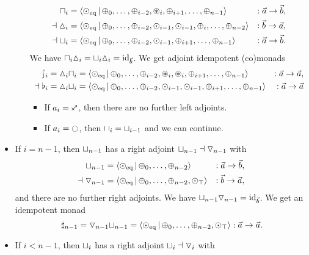 \documentclass[a4paper]{memoir}
\begin{document}
\begin{example}
\begin{itemize}
\begin{itemize}
			\begin{align*}
				{\sqcap}_i &= \mathopen{}\left\langle {\odot}_{\mathrm{eq}} \,\middle|\, {\oplus}_0, \ldots, {\oplus}_{i-2}, {\oast}_i, {\oplus}_{i+1}, \ldots, {\oplus}_{n-1} \right\rangle\mathclose{}
				&: \vec a \to \vec b, \\
				\dashv
				{\vartriangle}_i &= \mathopen{}\left\langle {\odot}_{\mathrm{eq}} \,\middle|\, {\oplus}_0, \ldots, {\oplus}_{i-2}, {\odot}_{i-1}, {\odot}_{i-1}, {\oplus}_i, \ldots, {\oplus}_{n-2} \right\rangle\mathclose{}
				&: \vec b \to \vec a, \\
				\dashv
				{\sqcup}_i &= \mathopen{}\left\langle {\odot}_{\mathrm{eq}} \,\middle|\, {\oplus}_0, \ldots, {\oplus}_{i-2}, {\odot}_{i-1}, {\oplus}_{i+1}, \ldots, {\oplus}_{n-1} \right\rangle\mathclose{}
				&: \vec a \to \vec b.
			\end{align*}
			We have ${\sqcap}_i {\vartriangle}_i = {\sqcup}_i {\vartriangle}_i = \mathrm{id}_{\vec b}$. We get adjoint idempotent (co)monads
			\begin{align*}
				\rbag_i = {\vartriangle}_i {\sqcap}_i &= \mathopen{}\left\langle {\odot}_{\mathrm{eq}} \,\middle|\, {\oplus}_0, \ldots, {\oplus}_{i-2}, {\oast}_i, {\oast}_i, {\oplus}_{i+1}, \ldots, {\oplus}_{n-1} \right\rangle\mathclose{} &: \vec a \to \vec a, \\
				\dashv
				\flat_i = {\vartriangle}_i {\sqcup}_i &= \mathopen{}\left\langle {\odot}_{\mathrm{eq}} \,\middle|\, {\oplus}_0, \ldots, {\oplus}_{i-2}, {\odot}_{i-1}, {\odot}_{i-1}, {\oplus}_{i+1}, \ldots, {\oplus}_{n-1} \right\rangle\mathclose{} &: \vec a \to \vec a
			\end{align*}
			\begin{itemize}
				\item If $a_i = \ypolar$, then there are no further left adjoints.
				\item If $a_i = \npolar$, then ${\sqcap}_i = {\sqcup}_{i-1}$ and we can continue.
			\end{itemize}
		\end{itemize}
		\item If $i = n-1$, then ${\sqcup}_{n-1}$ has a right adjoint ${\sqcup}_{n-1} \dashv {\triangledown}_{n-1}$ with
		\begin{align*}
			{\sqcup}_{n-1} &= \mathopen{}\left\langle {\odot}_{\mathrm{eq}} \,\middle|\, {\oplus}_0, \ldots, {\oplus}_{n-2} \right\rangle\mathclose{} &: \vec a \to \vec b, \\
			\dashv
			{\triangledown}_{n-1} &= \mathopen{}\left\langle {\odot}_{\mathrm{eq}} \,\middle|\, {\oplus}_0, \ldots, {\oplus}_{n-2}, {\odot}_\top \right\rangle\mathclose{} &: \vec b \to \vec a,
		\end{align*}
		and there are no further right adjoints.
		We have ${\sqcup}_{n-1} {\triangledown}_{n-1} = \mathrm{id}_{\vec b}$.
		We get an idempotent monad
		\[
			\sharp_{n-1} = {\triangledown}_{n-1} {\sqcup}_{n-1} = \mathopen{}\left\langle {\odot}_{\mathrm{eq}} \,\middle|\, {\oplus}_0, \ldots, {\oplus}_{n-2}, {\odot}_\top \right\rangle\mathclose{} : \vec a \to \vec a.
		\]
		\item If $i < n-1$, then ${\sqcup}_i$ has a right adjoint ${\sqcup}_i \dashv {\triangledown}_i$ with

\end{itemize}
\end{example}
\end{document}
